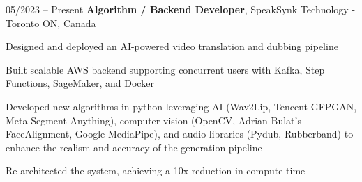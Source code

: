 \begin{twocolentry}{
    05/2023 – Present
}
\fontsize{11 pt}{11 pt}\textbf{Algorithm / Backend Developer}, SpeakSynk Technology - Toronto ON, Canada\end{twocolentry}

\vspace{0.10 cm}
\begin{onecolentry}
    \begin{highlights}
        \item Designed and deployed an AI-powered video translation and dubbing pipeline
        \item Built scalable AWS backend supporting concurrent users with Kafka, Step Functions, SageMaker, and Docker
        \item Developed new algorithms in python leveraging AI (Wav2Lip, Tencent GFPGAN, Meta Segment Anything), computer vision (OpenCV, Adrian Bulat’s FaceAlignment, Google MediaPipe), and audio libraries (Pydub, Rubberband) to enhance the realism and accuracy of the generation pipeline 
        \item Re-architected the system, achieving a 10x reduction in compute time
    \end{highlights}
\end{onecolentry}